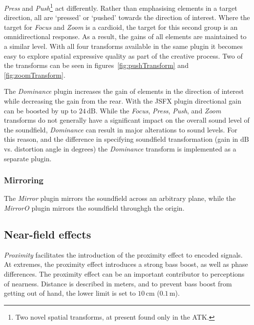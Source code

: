\documentclass{article}
\begin{document}
\emph{Press} and \emph{Push}\footnote{Two novel spatial transforms, at present found only in the ATK.} act differently. Rather than emphasising elements in a target direction, all are `pressed' or `pushed' towards the direction of interest. Where the target for \emph{Focus} and \emph{Zoom} is a cardioid, the target for this second group is an omnidirectional response. As a result, the gains of all elements are maintained to a similar level. With all four transforms available in the same plugin it becomes easy to explore spatial expressive quality as part of the creative process. Two of the transforms can be seen in figures~\ref{fig:pushTransform} and \ref{fig:zoomTransform}.

The \emph{Dominance} plugin increases the gain of elements in the direction of interest while decreasing the gain from the rear.
With the JSFX plugin directional gain can be boosted by up to $24\,\mathrm{dB}$.
While the \emph{Focus}, \emph{Press}, \emph{Push}, and \emph{Zoom} transforms do not generally have a significant impact on the overall sound level of the soundfield, \emph{Dominance} can result in major alterations to sound levels.
For this reason, and the difference in specifying soundfield transformation (gain in $\mathrm{dB}$ vs. distortion angle in $\mathrm{degrees}$) the \emph{Dominance} transform is implemented as a separate plugin.


\subsubsection{Mirroring}\label{sec:mirror}

The \emph{Mirror} plugin mirrors the soundfield across an arbitrary plane, while the \emph{MirrorO} plugin mirrors the soundfield throughgh the origin.



\subsection{Near-field effects}\label{sec:near-field}

\emph{Proximity} facilitates the introduction of the proximity effect to encoded signals.
At extremes, the proximity effect introduces a strong bass boost, as well as phase differences.
The proximity effect can be an important contributor to perceptions of nearness.
Distance is described in meters, and to prevent bass boost from getting out of hand, the lower limit is set to $10\,\mathrm{cm}$ ($0.1\,\mathrm{m}$).
\end{document}
